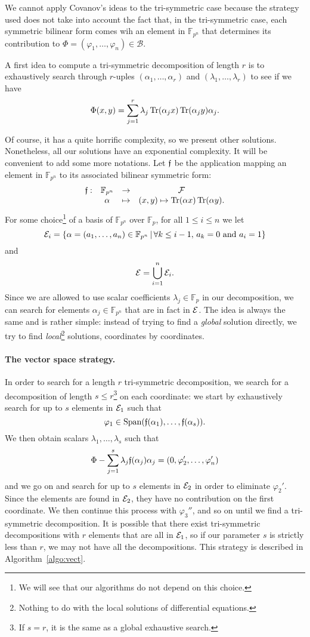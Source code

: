 \documentclass[a4paper,11pt]{article}
\begin{document}
We cannot apply Covanov's ideas to the tri-symmetric case because the strategy
used does not take into account the fact that, in the tri-symmetric case, each
symmetric bilinear form comes wih an element in $\mathbb{F}_{p^n}$ that
determines its
contribution to $\Phi=(\varphi_1, \dots, \varphi_n)\in\mathcal B$. 

A first idea to compute a tri-symmetric decomposition of length $r$ is to
exhaustively search through $r$-uples $(\alpha_1, \dots, \alpha_r)$ and
$(\lambda_1, \dots, \lambda_r)$ to see if we have
\[
  \Phi(x, y) = \sum_{j=1}^r \lambda_j\operatorname{Tr}(\alpha_j x)\operatorname{Tr}(\alpha_j y)\alpha_j.
\]

Of course, it has a quite horrific complexity, so we present other solutions.
Nonetheless, all our solutions have an exponential complexity. 
It will be convenient to add some more notations.
Let $\mathfrak{f}$ be the application mapping an element in
$\mathbb{F}_{p^n}$ to its associated bilinear symmetric form:
\[
\begin{array}{cccc}
  \mathfrak{f}: & \mathbb{F}_{p^n} & \to & \mathcal F \\
  & \alpha & \mapsto & (x, y)\mapsto \operatorname{Tr}(\alpha x)\operatorname{Tr}(\alpha y).
\end{array}
\]
For some choice\footnote{We will see that our algorithms do not depend on this
choice.} of a basis of $\mathbb{F}_{p^n}$ over $\mathbb{F}_p$, for all
$1\leq i\leq n$ we let
\[
  \mathcal{E}_i=\left\{ \alpha=(a_1, \dots, a_n)\in\mathbb{F}_{p^n}
  \,|\, \forall k\leq i-1,\,a_k=0\text{ and }a_i=1 \right\}
\]
and
\[
  \mathcal{E} = \bigcup_{i=1}^n\mathcal{E}_i.
\]
Since we are allowed to use scalar coefficients $\lambda_j\in\mathbb{F}_p$ in our decomposition,
we can search for elements $\alpha_j\in\mathbb{F}_{p^n}$ that are in fact in
$\mathcal{E}$. The idea is always the same and is rather simple: instead of trying to find a
\emph{global} solution directly, we try to find \emph{local}\footnote{Nothing to
do with the local solutions of differential equations.} solutions, \ie coordinates by
coordinates.

\paragraph{The vector space strategy.}
In order to search for a length $r$ tri-symmetric decomposition, we
search for a decomposition of length $s\leq r$\footnote{If $s=r$, it is the same
as a global exhaustive search.} on each coordinate: we start by exhaustively
search for up to $s$ elements in $\mathcal{E}_1$ such that
\[
  \varphi_1\in\operatorname{Span}(\mathfrak{f}(\alpha_1), \dots, \mathfrak{f}(\alpha_s)).
\]
We then obtain scalars $\lambda_1, \dots, \lambda_s$ such that
\[
  \Phi-\sum_{j=1}^s\lambda_j\mathfrak{f}(\alpha_j)\alpha_j=(0, \varphi_2', \dots,
  \varphi_n')
\]
and we go on and search for up to $s$ elements in $\mathcal{E}_2$ in order to eliminate
$\varphi_2'$. Since the elements are
found in $\mathcal{E}_2$, they have no contribution on the first coordinate. We then
continue this process with $\varphi_3''$, and so on until we find a
tri-symmetric decomposition. It is
possible that there exist tri-symmetric decompositions with $r$ elements that
are all in $\mathcal{E}_1$, so if our parameter $s$ is strictly less than $r$, we may not
have all the decompositions. This strategy is described in
Algorithm~\ref{algo:vect}.
\end{document}
